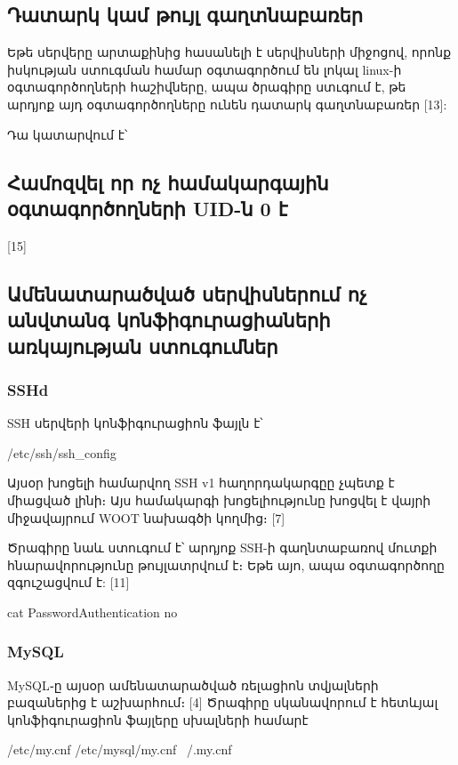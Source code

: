 \documentclass[a4paper,12pt]{article}
\begin{document}
\begin{sloppypar}
\subsection{Դատարկ կամ թույլ գաղտնաբառեր}

Եթե սերվերը արտաքինից հասանելի է սերվիսների միջոցով,
որոնք իսկության ստուգման համար օգտագործում են լոկալ
linux-ի օգտագործողների հաշիվները, ապա ծրագիրը ստւգում է,
թե արդյոք այդ օգտագործողները ունեն դատարկ գաղտնաբառեր [13]:

Դա կատարվում է՝



\subsection{Համոզվել որ ոչ համակարգային օգտագործողների UID-ն 0 է}

[15]


\subsection{Ամենատարածված սերվիսներում ոչ անվտանգ կոնֆիգուրացիաների առկայության ստուգումներ}

\subsubsection{SSHd}

SSH սերվերի կոնֆիգուրացիոն ֆայլն է՝

    /etc/ssh/ssh\_config

Այսօր խոցելի համարվող SSH v1 հաղորդակարգըը չպետք է միացված լինի։
Այս համակարգի խոցելիությունը խոցվել է վայրի միջավայրում WOOT
նախագծի կողմից։ [7]

Ծրագիրը նաև ստուգում է՝ արդյոք SSH-ի գաղնտաբառով մուտքի
հնարավորությունը թույլատրվում է։ Եթե այո, ապա օգտագործողը
զգուշացվում է: [11]

    cat PasswordAuthentication no

\subsubsection{MySQL}

MySQL֊ը այսօր ամենատարածված ռելացիոն տվյալների բազաներից է աշխարհում։ [4]
Ծրագիրը սկանավորում է հետևյալ կոնֆիգուրացիոն ֆայլերը սխալների համարէ

    /etc/my.cnf
    /etc/mysql/my.cnf
    ~/.my.cnf


\end{sloppypar}
\end{document}

